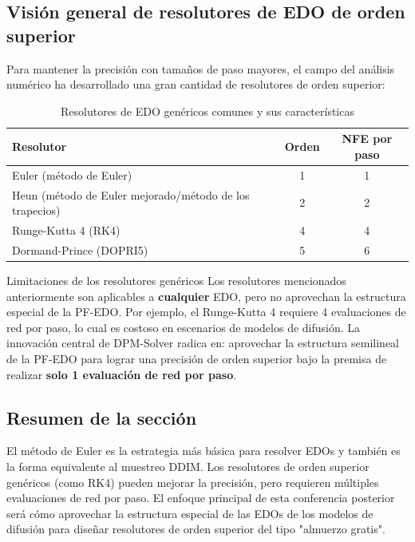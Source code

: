 \subsection{Visión general de resolutores de EDO de orden superior}

Para mantener la precisión con tamaños de paso mayores, el campo del análisis numérico ha desarrollado una gran cantidad de resolutores de orden superior:

\begin{table}[H]
\centering
\begin{tabular}{lcc}
\toprule
\textbf{Resolutor} & \textbf{Orden} & \textbf{NFE por paso} \\
\midrule
Euler (método de Euler) & 1 & 1 \\
Heun (método de Euler mejorado/método de los trapecios) & 2 & 2 \\
Runge-Kutta 4 (RK4) & 4 & 4 \\
Dormand-Prince (DOPRI5) & 5 & 6 \\
\bottomrule
\end{tabular}
\caption{Resolutores de EDO genéricos comunes y sus características}
\end{table}

\begin{warningbox}{Limitaciones de los resolutores genéricos}
Los resolutores mencionados anteriormente son aplicables a \textbf{cualquier} EDO, pero no aprovechan la estructura especial de la PF-EDO. Por ejemplo, el Runge-Kutta 4 requiere 4 evaluaciones de red por paso, lo cual es costoso en escenarios de modelos de difusión. La innovación central de DPM-Solver radica en: aprovechar la estructura semilineal de la PF-EDO para lograr una precisión de orden superior bajo la premisa de realizar \textbf{solo 1 evaluación de red por paso}.
\end{warningbox}

\subsection{Resumen de la sección}

El método de Euler es la estrategia más básica para resolver EDOs y también es la forma equivalente al muestreo DDIM. Los resolutores de orden superior genéricos (como RK4) pueden mejorar la precisión, pero requieren múltiples evaluaciones de red por paso. El enfoque principal de esta conferencia posterior será cómo aprovechar la estructura especial de las EDOs de los modelos de difusión para diseñar resolutores de orden superior del tipo "almuerzo gratis".
